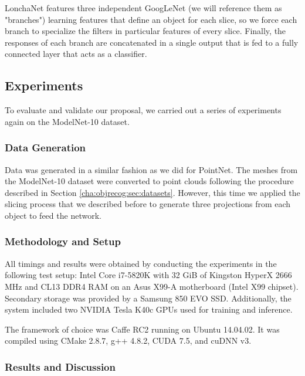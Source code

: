 LonchaNet features three independent GoogLeNet (we will reference them as "branches") learning features that define an object for each slice, so we force each branch to specialize the filters in  particular features of every slice. Finally, the responses of each branch are concatenated in a single output that is fed to a fully connected layer that acts as a classifier.

\subsection{Experiments}
\label{cha:objrecog:sec:lonchanet:subsec:experiments}

To evaluate and validate our proposal, we carried out a series of experiments again on the ModelNet-10 dataset.

\subsubsection{Data Generation}
\label{cha:objrecog:sec:lonchanet:subsec:experiments:subsubsec:data}

Data was generated in a similar fashion as we did for PointNet. The meshes from the ModelNet-10 dataset were converted to point clouds following the procedure described in Section \ref{cha:objrecog:sec:datasets}. However, this time we applied the slicing process that we described before to generate three projections from each object to feed the network.

\subsubsection{Methodology and Setup}
\label{cha:objrecog:sec:lonchanet:subsec:experiments:subsubsec:methodology}

All timings and results were obtained by conducting the experiments in the following test setup: Intel Core i7-5820K with 32 GiB of Kingston HyperX 2666 MHz and CL13 DDR4 RAM on an Asus X99-A motherboard (Intel X99 chipset). Secondary storage was provided by a Samsung 850 EVO SSD. Additionally, the system included two NVIDIA Tesla K40c \acp{GPU} used for training and inference.

The framework of choice was Caffe RC2 running on Ubuntu 14.04.02. It was compiled using CMake 2.8.7, g++ 4.8.2, CUDA 7.5, and cuDNN v3.

\subsubsection{Results and Discussion}
\label{cha:objrecog:sec:lonchanet:subsec:experiments:subsubsec:results}

